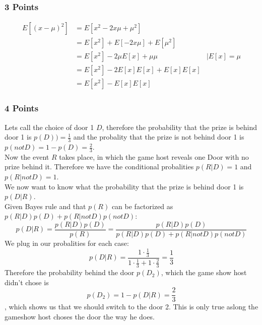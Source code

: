 \subsubsection{3 Points}
\begin{align*}
E[(x-\mu)^2] &= E[x^2-2 x \mu + \mu^2]\\
&= E[x^2] + E[-2 x \mu] + E[\mu^2]\\
&=  E[x^2] -2 \mu E[x] +  \mu \mu & | E[x]=\mu\\
&=  E[x^2] -2 E[x] E[x] +  E[x] E[x] \\
&=  E[x^2] -  E[x] E[x] 
\end{align*}
\subsubsection{4 Points}
Lets call the choice of  door 1 $D$, therefore the probability that the prize is behind door 1 is $p(D))=\frac{1}{3}$ and the probality that the prize is not behind door 1 is $p(not D) = 1- p(D) = \frac{2}{3}$.\\ Now the event $R$ takes place, in which the game host reveals one Door with no prize behind it. Therefore we have the conditional probalities $p(R|D) = 1$ and $p(R|not D) = 1$.\\ We now want to know what the probability that the prize is behind door 1 is $p(D|R)$.\\
Given Bayes rule and that $p(R)$ can be factorized as $p(R|D)p(D) + p(R|not D)p(not D)$:
 $$p(D|R)= \frac{p(R|D)p(D)}{p(R)}= \frac{p(R|D)p(D)}{p(R|D)p(D) + p(R|not D)p(not D)} $$ 
 We plug in our probalities for each case:
 $$ p(D|R)= \frac{1\cdot \frac{1}{3}}{1\cdot  \frac{1}{3} +1 \cdot  \frac{2}{3}} =  \frac{1}{3} $$
 Therefore the probability behind the door $p(D_2)$,  which the game show host didn't chose is
 $$p(D_2) = 1 - p(D|R) = \frac{2}{3}$$
 , which shows us that we should switch to the door 2. This is only true aslong the gameshow host choses the door the way he does.